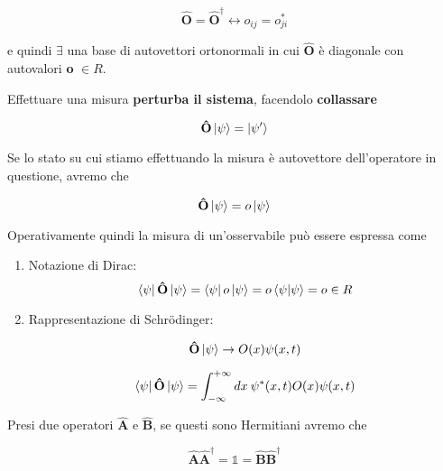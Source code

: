 \begin{equation}
\mathbf{\hat O} = \mathbf{\hat O^\dagger} \longleftrightarrow o_{ij}=o^*_{ji}
\end{equation}

e quindi $\exists$ una base di autovettori ortonormali in cui $\mathbf{\hat O}$ è diagonale con autovalori \textbf{o} $\in R$.\newline

Effettuare una misura \textbf{perturba il sistema}, facendolo \textbf{collassare}

\begin{equation}
\mathbf{\hat O} \ket{\psi}=\ket{\psi'}
\end{equation}

Se lo stato su cui stiamo effettuando la misura è autovettore dell'operatore in questione, avremo che

\begin{equation}
\mathbf{\hat O} \ket{\psi}=o\ket{\psi}
\end{equation}

Operativamente quindi la misura di un'osservabile può essere espressa come

\begin{enumerate}
	\item Notazione di Dirac: 
	\begin{equation}
\bra{\psi}	\mathbf{\hat O} \ket{\psi}=\bra{\psi} o \ket{\psi}= o \braket{\psi | \psi}= o \in R
	\end{equation}
	\item Rappresentazione di Schrödinger:
	
	\begin{equation}
\mathbf{\hat O} \ket{\psi} \rightarrow O(x)\psi(x,t)
	\end{equation}
	
	\begin{equation}
\bra{\psi}	\mathbf{\hat O} \ket{\psi}= \int_{-\infty}^{+\infty}dx \: \psi^*(x,t)O(x)\psi(x,t)
\end{equation}
	
\end{enumerate}


Presi due operatori $\mathbf{\hat A}$ e $\mathbf{\hat B}$, se questi sono Hermitiani avremo che 

	\begin{equation}
\mathbf{\hat A}\mathbf{\hat A^\dagger}= \mathds{1} =\mathbf{\hat B}\mathbf{\hat B^\dagger}
\end{equation}

